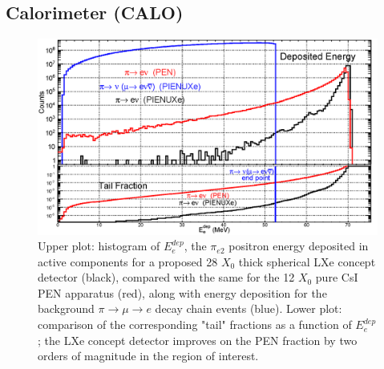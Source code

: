 \subsection{Calorimeter (CALO)}
\begin{figure}[h!]
\centering
\includegraphics[scale=0.6]{sections/figures/tail.png}
\caption{Upper plot: histogram of $E_{e}^{dep}$, the $\pi_{e2}$ positron energy deposited in active components for a proposed 28 $X_{0}$ thick spherical LXe concept detector (black), compared with the same for the 12 $X_{0}$ pure CsI PEN apparatus (red), along with energy deposition
for the background $\pi \rightarrow \mu \rightarrow e$ decay chain events (blue).  Lower plot: comparison of the corresponding "tail" fractions as a function of $E_{e}^{dep}$; the LXe concept detector improves on the PEN fraction by two orders of magnitude in the region of interest.
}
\label{fig:tail}
\end{figure}


